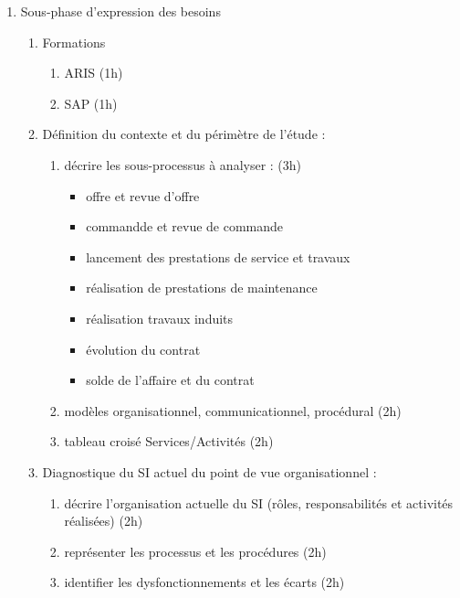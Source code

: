 \begin{enumerate}
    \item Sous-phase d'expression des besoins
          \begin{enumerate}
            \item Formations 
                \begin{enumerate}
                  \item ARIS (1h)
                  \item SAP (1h)
                \end{enumerate}
            \item Définition du contexte et du périmètre de l'étude :
                \begin{enumerate}
                  \item décrire les sous-processus à analyser : (3h)
                    \begin{itemize}
                      \item offre et revue d'offre 
                      \item commandde et revue de commande
                      \item lancement des prestations de service et travaux
                      \item réalisation de prestations de maintenance
                      \item réalisation travaux induits
                      \item évolution du contrat
                      \item solde de l'affaire et du contrat 
                    \end{itemize}
                  \item modèles organisationnel, communicationnel, procédural (2h)
                  \item tableau croisé Services/Activités (2h) 
                \end{enumerate}
            \item Diagnostique du SI actuel du point de vue organisationnel : 
                \begin{enumerate}
                  \item décrire l'organisation actuelle du SI (rôles, responsabilités et activités réalisées) (2h)
                  \item représenter les processus et les procédures (2h)
                  \item identifier les dysfonctionnements et les écarts (2h)
                \end{enumerate}

\end{enumerate}
\end{enumerate}
